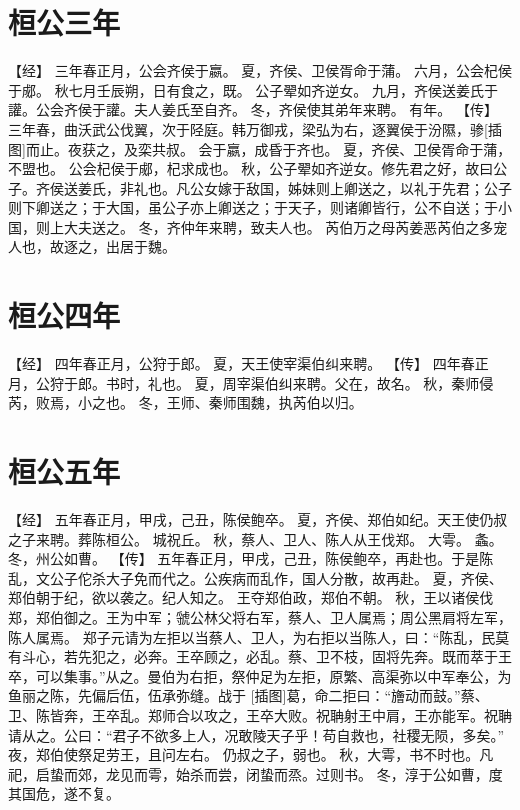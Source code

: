 \documentclass[a4paper,12pt,UTF8,twoside]{ctexbook}
\begin{document}
\section{桓公三年}

【经】
三年春正月，公会齐侯于嬴。
夏，齐侯、卫侯胥命于蒲。
六月，公会杞侯于郕。
秋七月壬辰朔，日有食之，既。
公子翚如齐逆女。
九月，齐侯送姜氏于讙。公会齐侯于讙。夫人姜氏至自齐。
冬，齐侯使其弟年来聘。
有年。
【传】
三年春，曲沃武公伐翼，次于陉庭。韩万御戎，梁弘为右，逐翼侯于汾隰，骖[插图]而止。夜获之，及栾共叔。
会于嬴，成昏于齐也。
夏，齐侯、卫侯胥命于蒲，不盟也。
公会杞侯于郕，杞求成也。
秋，公子翚如齐逆女。修先君之好，故曰公子。齐侯送姜氏，非礼也。凡公女嫁于敌国，姊妹则上卿送之，以礼于先君；公子则下卿送之；于大国，虽公子亦上卿送之；于天子，则诸卿皆行，公不自送；于小国，则上大夫送之。
冬，齐仲年来聘，致夫人也。
芮伯万之母芮姜恶芮伯之多宠人也，故逐之，出居于魏。

\section{桓公四年}

【经】
四年春正月，公狩于郎。
夏，天王使宰渠伯纠来聘。
【传】
四年春正月，公狩于郎。书时，礼也。
夏，周宰渠伯纠来聘。父在，故名。
秋，秦师侵芮，败焉，小之也。
冬，王师、秦师围魏，执芮伯以归。

\section{桓公五年}

【经】
五年春正月，甲戌，己丑，陈侯鲍卒。
夏，齐侯、郑伯如纪。天王使仍叔之子来聘。葬陈桓公。
城祝丘。
秋，蔡人、卫人、陈人从王伐郑。
大雩。
螽。
冬，州公如曹。
【传】
五年春正月，甲戌，己丑，陈侯鲍卒，再赴也。于是陈乱，文公子佗杀大子免而代之。公疾病而乱作，国人分散，故再赴。
夏，齐侯、郑伯朝于纪，欲以袭之。纪人知之。
王夺郑伯政，郑伯不朝。
秋，王以诸侯伐郑，郑伯御之。王为中军；虢公林父将右军，蔡人、卫人属焉；周公黑肩将左军，陈人属焉。
郑子元请为左拒以当蔡人、卫人，为右拒以当陈人，曰：“陈乱，民莫有斗心，若先犯之，必奔。王卒顾之，必乱。蔡、卫不枝，固将先奔。既而萃于王卒，可以集事。”从之。曼伯为右拒，祭仲足为左拒，原繁、高渠弥以中军奉公，为鱼丽之陈，先偏后伍，伍承弥缝。战于 [插图]葛，命二拒曰：“旝动而鼓。”蔡、卫、陈皆奔，王卒乱。郑师合以攻之，王卒大败。祝聃射王中肩，王亦能军。祝聃请从之。公曰：“君子不欲多上人，况敢陵天子乎！苟自救也，社稷无陨，多矣。”
夜，郑伯使祭足劳王，且问左右。
仍叔之子，弱也。
秋，大雩，书不时也。凡祀，启蛰而郊，龙见而雩，始杀而尝，闭蛰而烝。过则书。
冬，淳于公如曹，度其国危，遂不复。
\end{document}
